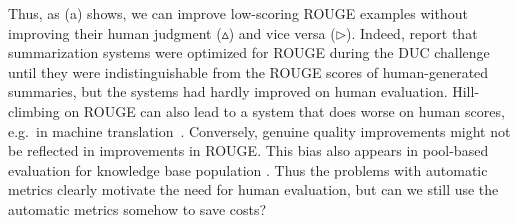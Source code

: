 Thus, as (a) shows, we can improve low-scoring ROUGE examples without improving their human judgment ($\vartriangle$) and vice versa ($\triangleright$).
Indeed, \citet{conroy2008mind} report that summarization systems were optimized for ROUGE during the DUC challenge~\citep{dang2006overview}
until they were indistinguishable from the ROUGE scores of human-generated summaries, but the systems had hardly improved on human evaluation.
Hill-climbing on ROUGE can also lead to a system that does worse on human scores, e.g.\ in machine translation~\citep{wu2016google}.
Conversely, genuine quality improvements might not be reflected in improvements in ROUGE\@.
This bias also appears in pool-based evaluation for knowledge base population \citep{chaganty2017unbiased}.
Thus the problems with automatic metrics clearly motivate the need for human evaluation,
but can we still use the automatic metrics somehow to save costs?



